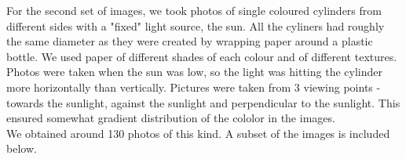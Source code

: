 \documentclass[12pt,a4paper]{article}
\begin{document}
	For the second set of images, we took photos of single coloured cylinders from different sides with a "fixed" light source, the sun. All the cyliners had roughly the same diameter as they were created by wrapping paper around a plastic bottle. We used paper of different shades of each colour and of different textures. \\
	
	Photos were taken when the sun was low, so the light was hitting the cylinder more horizontally than vertically. Pictures were taken from 3 viewing points - towards the sunlight, against the sunlight and perpendicular to the sunlight. This ensured somewhat gradient distribution of the cololor in the images. \\
	
	We obtained around 130 photos of this kind. A subset of the images is included below.

	
\end{document}
